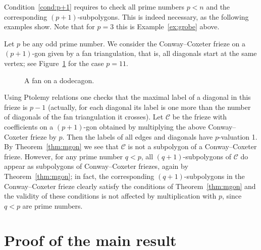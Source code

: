 \documentclass[ALCO,ThmDefs,Unicode,epreuves,published]{cedram}
\numberwithin{equation}{section}
\begin{document}
\begin{exam} \label{ex:p+1}
Condition~\eqref{cond:p+1} requires to check all prime numbers $p<n$ and the
corresponding $(p+1)$-subpolygons. This is indeed necessary, as the following 
examples show. Note that for $p=3$ this is Example~\ref{ex:grobe}
above. 

Let $p$ be any odd prime number. We consider the Conway--Coxeter frieze
on a $(p+1)$-gon given by a fan triangulation,
that is, all diagonals start
at the same vertex; see Figure~\ref{fig:fan} for the case $p=11$. 

\begin{figure}[htb]\centering
{}
 \caption{A fan on a dodecagon. 
 \label{fig:fan}}
\end{figure}

Using Ptolemy relations one checks that the maximal label of a diagonal 
in this frieze is $p-1$ (actually, for each diagonal its label is one more
than the number of diagonals of the fan triangulation it crosses). 
Let $\mathcal{C}$ be the frieze with coefficients
on a $(p+1)$-gon obtained by multiplying the above Conway--Coxeter frieze
by $p$. Then the labels of all edges and diagonals have $p$-valuation 1.
By Theorem~\ref{thm:mgon} we see that $\mathcal{C}$ is not a subpolygon 
of a Conway--Coxeter frieze. However, for any prime number $q<p$, all 
$(q+1)$-subpolygons of $\mathcal{C}$ do appear as subpolygons of Conway--Coxeter
friezes, again by Theorem~\ref{thm:mgon}; in fact, the corresponding 
$(q+1)$-subpolygons in the Conway--Coxeter frieze clearly satisfy the conditions
of Theorem~\ref{thm:mgon} and the validity of these conditions is not 
affected by multiplication with $p$, since $q<p$ are prime numbers. 
\end{exam}



\section{Proof of the main result}
\label{sec:proof}
\end{document}
